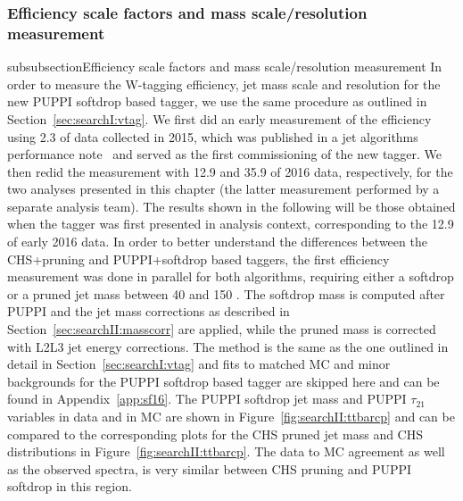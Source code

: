 \subsubsection{Efficiency scale factors and mass scale/resolution measurement} 
\label{sec:searchII:wtagsf}
subsubsection{Efficiency scale factors and mass scale/resolution measurement} 
\label{sec:searchII:wtagsf}
In order to measure the W-tagging efficiency, jet mass scale and resolution for the new PUPPI softdrop based tagger, we use the same procedure as outlined in Section~\ref{sec:searchI:vtag}. We first did an early measurement of the efficiency using 2.3 \fbinv of data collected in 2015, which was published in a jet algorithms performance note~\cite{CMS-PAS-JME-16-003} and served as the first commissioning of the new tagger. We then redid the measurement with 12.9 and 35.9 \fbinv of 2016 data, respectively, for the two analyses presented in this chapter (the latter measurement performed by a separate analysis team). The results shown in the following will be those obtained when the tagger was first presented in analysis context, corresponding to the 12.9 \fbinv of early 2016 data.
In order to better understand the differences between the CHS+pruning and PUPPI+softdrop based taggers, the first efficiency measurement was done in parallel for both algorithms, requiring either a softdrop or a pruned jet mass between 40 \GeV and 150 \GeV. The softdrop mass is computed after PUPPI and the jet mass corrections as described in Section~\ref{sec:searchII:masscorr} are applied, while the pruned mass is corrected with L2L3 jet energy corrections. 
The method is the same as the one outlined in detail in Section~\ref{sec:searchI:vtag} and fits to matched \ttbar MC and minor backgrounds for the PUPPI softdrop based tagger are skipped here and can be found in Appendix~\ref{app:sf16}.\newline
The PUPPI softdrop jet mass and PUPPI $\tau_{21}$ variables in data and in MC are shown in Figure~\ref{fig:searchII:ttbarcp} and can be compared to the corresponding plots for the CHS pruned jet mass and CHS \nsubj distributions in Figure~\ref{fig:searchII:ttbarcp}. The data to MC agreement as well as the observed spectra, is very similar between CHS pruning and PUPPI softdrop in this region.

